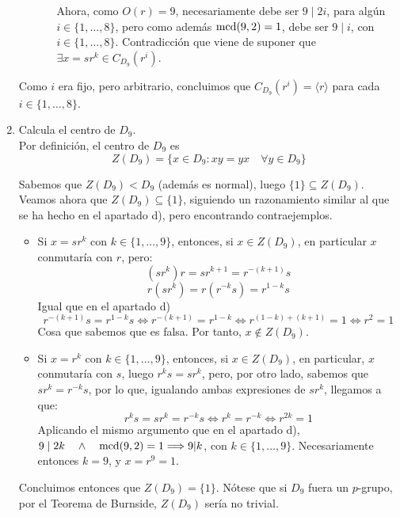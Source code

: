 \documentclass[12pt]{article}
\begin{document}
\begin{ejercicio}[3 puntos]
\begin{enumerate}[label=(\alph*)]
\begin{itemize}
\begin{itemize}
                    Ahora, como $O(r) = 9$, necesariamente debe ser $9 \mid 2i$, para algún $i \in \{1, \ldots, 8\}$, pero como además $\operatorname{mcd}(9,2) = 1$, debe ser $9 \mid i$, con $i \in \{1, \ldots, 8\}$. Contradicción que viene de suponer que $\exists x = sr^k \in C_{D_9}(r^i)$.
                \end{itemize}  
            \end{itemize}

            Como $i$ era fijo, pero arbitrario, concluimos que $C_{D_9}(r^i) = \langle r \rangle$ para cada $i \in \{1, \ldots, 8\}$.

            \item Calcula el centro de $D_9$. \\
            
            Por definición, el centro de $D_9$ es $$Z(D_9) = \{x \in D_9 : xy = yx \quad \forall y \in D_9\}$$ 

            Sabemos que $Z(D_9) < D_9$ (además es normal), luego $\{1\} \subseteq Z(D_9)$. Veamos ahora que $Z(D_9) \subseteq \{1\}$, siguiendo un razonamiento similar al que se ha hecho en el apartado d), pero encontrando contraejemplos.

            \begin{itemize}
                \item Si $x = sr^k$ con $k \in \{1, \ldots, 9\}$, entonces, si $x \in Z(D_9)$, en particular $x$ conmutaría con $r$, pero:
                $$(sr^k)r = sr^{k+1} = r^{-(k+1)}s$$
                $$r(sr^k) = r(r^{-k}s) = r^{1-k}s$$
                Igual que en el apartado d) $$r^{-(k+1)}s = r^{1-k}s \iff r^{-(k+1)} = r^{1-k} \iff r^{(1-k)+(k+1)} = 1 \iff r^{2} = 1$$
                Cosa que sabemos que es falsa. Por tanto, $x \notin Z(D_9)$.
                \item Si $x = r^k$ con $k \in \{1, \ldots, 9\}$, entonces, si $x \in Z(D_9)$, en particular, $x$ conmutaría con $s$, luego $r^k s = s r^k$, pero, por otro lado, sabemos que $sr^k = r^{-k}s$, por lo que, igualando ambas expresiones de $sr^k$, llegamos a que:
                $$r^{k}s = sr^k = r^{-k}s \iff r^k = r^{-k} \iff r^{2k} = 1$$
                Aplicando el mismo argumento que en el apartado d), $9 \mid 2k \quad \land \quad \operatorname{mcd}(9,2) = 1 \Longrightarrow 9|k$, con $k \in \{1, \ldots, 9\}$. Necesariamente entonces $k=9$, y $x = r^{9} = 1$. 
            \end{itemize}

            Concluimos entonces que $Z(D_9) = \{1\}$. Nótese que si $D_9$ fuera un $p$-grupo, por el Teorema de Burnside, $Z(D_9)$ sería no trivial.


\end{enumerate}
\end{ejercicio}
\end{document}
